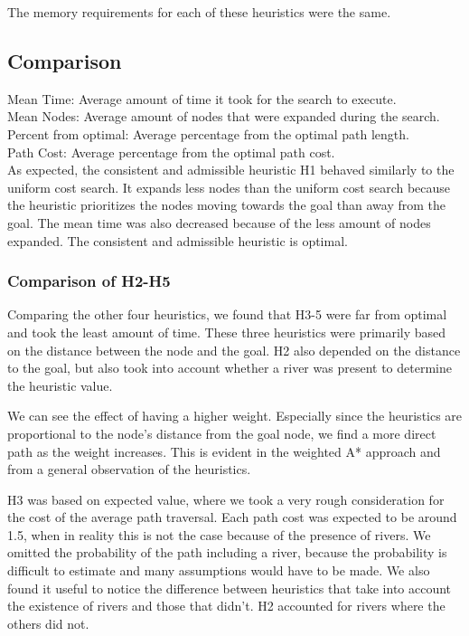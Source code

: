 The memory requirements for each of these heuristics were the same.

\subsection{Comparison}

Mean Time: Average amount of time it took for the search to execute. \\
Mean Nodes: Average amount of nodes that were expanded during the search. \\
Percent from optimal: Average percentage from the optimal path length. \\ 
Path Cost: Average percentage from the optimal path cost. \\

As expected, the consistent and admissible heuristic H1 behaved similarly to the uniform cost search. It expands less nodes than the uniform cost search because the heuristic prioritizes the nodes moving towards the goal than away from the goal. The mean time was also decreased because of the less amount of nodes expanded.
The consistent and admissible heuristic is optimal.

\subsubsection{Comparison of H2-H5}
Comparing the other four heuristics, we found that H3-5 were far from optimal and took the least amount of time. These three heuristics were primarily based on the distance between the node and the goal. H2 also depended on the distance to the goal, but also took into account whether a river was present to determine the heuristic value.

We can see the effect of having a higher weight. Especially since the heuristics are proportional to the node's distance from the goal node, we find a more direct path as the weight increases. This is evident in the weighted A* approach and from a general observation of the heuristics.

H3 was based on expected value, where we took a very rough consideration for the cost of the average path traversal. Each path cost was expected to be around 1.5, when in reality this is not the case because of the presence of rivers. We omitted the probability of the path including a river, because the probability is difficult to estimate and many assumptions would have to be made. We also found it useful to notice the difference between heuristics that take into account the existence of rivers and those that didn't. H2 accounted for rivers where the others did not.

